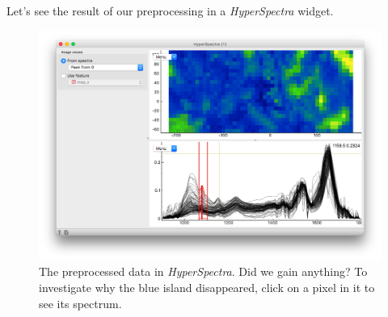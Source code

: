 Let's see the result of our preprocessing in a \textit{HyperSpectra} widget.

\begin{figure}[h]
    \vspace{-0.2cm}
    \includegraphics[scale=0.28]{spectral_preprocessing-fig3.png}
    \vspace{-1cm}
    \caption{The preprocessed data in \textit{HyperSpectra}. Did we gain anything? To investigate why the blue island disappeared, click on a pixel in it to see its spectrum.}
    \label{fig:spectral_preprocessing-fig3}
\end{figure}
